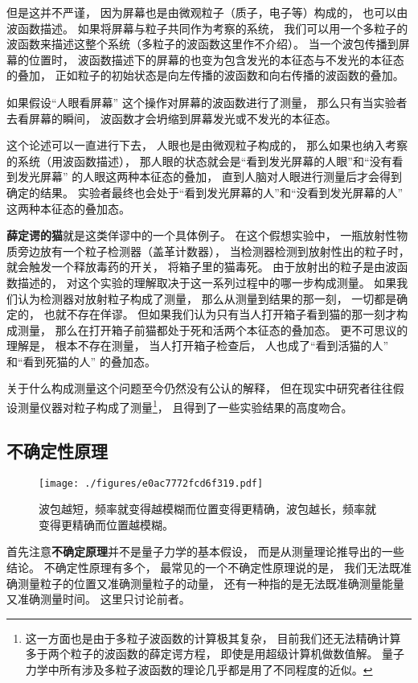 但是这并不严谨， 因为屏幕也是由微观粒子（质子，电子等）构成的， 也可以由波函数描述。 如果将屏幕与粒子共同作为考察的系统， 我们可以用一个多粒子的波函数来描述这整个系统（多粒子的波函数这里作不介绍）。 当一个波包传播到屏幕的位置时， 波函数描述下的屏幕的也变为包含发光的本征态与不发光的本征态的叠加， 正如粒子的初始状态是向左传播的波函数和向右传播的波函数的叠加。 

如果假设“人眼看屏幕” 这个操作对屏幕的波函数进行了测量， 那么只有当实验者去看屏幕的瞬间， 波函数才会坍缩到屏幕发光或不发光的本征态。

这个论述可以一直进行下去， 人眼也是由微观粒子构成的， 那么如果也纳入考察的系统（用波函数描述）， 那人眼的状态就会是“看到发光屏幕的人眼”和“没有看到发光屏幕” 的人眼这两种本征态的叠加， 直到人脑对人眼进行测量后才会得到确定的结果。 实验者最终也会处于“看到发光屏幕的人”和“没看到发光屏幕的人” 这两种本征态的叠加态。

\textbf{薛定谔的猫}就是这类佯谬中的一个具体例子。 在这个假想实验中， 一瓶放射性物质旁边放有一个粒子检测器（盖革计数器）， 当检测器检测到放射性出的粒子时， 就会触发一个释放毒药的开关， 将箱子里的猫毒死。 由于放射出的粒子是由波函数描述的， 对这个实验的理解取决于这一系列过程中的哪一步构成测量。 如果我们认为检测器对放射粒子构成了测量， 那么从测量到结果的那一刻， 一切都是确定的， 也就不存在佯谬。 但如果我们认为只有当人打开箱子看到猫的那一刻才构成测量， 那么在打开箱子前猫都处于死和活两个本征态的叠加态。 更不可思议的理解是， 根本不存在测量， 当人打开箱子检查后， 人也成了“看到活猫的人” 和“看到死猫的人” 的叠加态。

关于什么构成测量这个问题至今仍然没有公认的解释， 但在现实中研究者往往假设测量仪器对粒子构成了测量\footnote{这一方面也是由于多粒子波函数的计算极其复杂， 目前我们还无法精确计算多于两个粒子的波函数的薛定谔方程， 即使是用超级计算机做数值解。 量子力学中所有涉及多粒子波函数的理论几乎都是用了不同程度的近似。}， 且得到了一些实验结果的高度吻合。

\subsection{不确定性原理}

\begin{figure}[ht]
\centering
\texttt{[image: ./figures/e0ac7772fcd6f319.pdf]}
\caption{波包越短，频率就变得越模糊而位置变得更精确，波包越长，频率就变得更精确而位置越模糊。} \label{fig_QM0_5}
\end{figure}

首先注意\textbf{不确定原理}并不是量子力学的基本假设， 而是从测量理论推导出的一些结论。 不确定性原理有多个， 最常见的一个不确定性原理说的是， 我们无法既准确测量粒子的位置又准确测量粒子的动量， 还有一种指的是无法既准确测量能量又准确测量时间。 这里只讨论前者。

